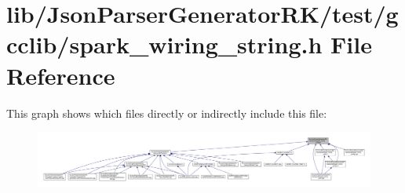 \section{lib/\+Json\+Parser\+Generator\+R\+K/test/gcclib/spark\+\_\+wiring\+\_\+string.h File Reference}
\label{test_2gcclib_2spark__wiring__string_8h}
This graph shows which files directly or indirectly include this file\+:\nopagebreak
\begin{figure}[H]
\begin{center}
\leavevmode
\includegraphics[width=350pt]{test_2gcclib_2spark__wiring__string_8h__dep__incl}
\end{center}
\end{figure}
